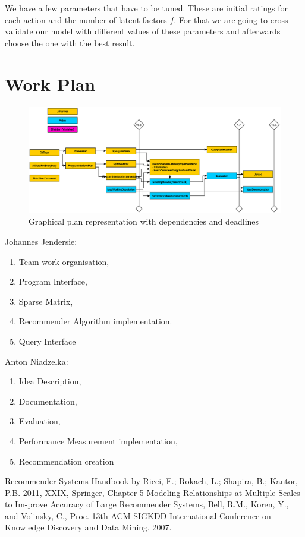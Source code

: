 \documentclass[pdftex,a4paper,11pt]{article}
\begin{document}
We have a few parameters that have to be tuned. These are initial ratings for each action and the number of latent factors $ f $. For that we are going to cross validate our model with different values of these parameters and afterwards choose the one with the best result. 

\section{Work Plan}

\begin{figure}[ht]
	\includegraphics[width=1\textwidth]{WorkPlan.eps}
	\caption{Graphical plan representation with dependencies and deadlines}
	\label{fig:WP}
\end{figure}

Johannes Jendersie:

\begin{enumerate}
\item Team work organisation,
\item Program Interface,
\item Sparse Matrix,
\item Recommender Algorithm implementation.
\item Query Interface
\end{enumerate}
Anton Niadzelka:

\begin{enumerate}
\item Idea Description, 
\item Documentation,
\item Evaluation,
\item Performance Measurement implementation,
\item Recommendation creation
\end{enumerate}

\begin{thebibliography}{99}
 Recommender Systems Handbook by Ricci, F.; Rokach, L.; Shapira, B.; Kantor, P.B. 2011, XXIX, Springer,  Chapter 5
  Modeling Relationships at Multiple Scales to Im-prove Accuracy of Large Recommender Systems, Bell, R.M., Koren, Y., and Volinsky, C., Proc. 13th ACM SIGKDD International
Conference on Knowledge Discovery and Data Mining, 2007.
\end{thebibliography}
\nocite{*}


\end{document}
